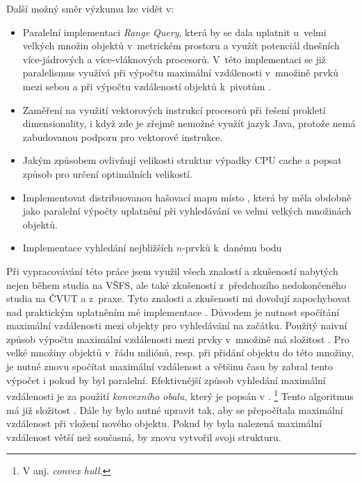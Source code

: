 Další možný směr výzkumu  lze vidět v:
\begin{itemize}
\item Paralelní implementaci \emph{Range Query}, která by se dala uplatnit u~velmi velkých množin objektů v~metrickém prostoru a využít potenciál dnešních více-jádrových a více-vláknových procesorů. V~této implementaci se již paralelismus využívá při výpočtu maximální vzdálenosti v~množině prvků mezi sebou a při výpočtu vzdáleností objektů k~pivotům .
\item Zaměření na využití vektorových instrukcí procesorů při řešení prokletí dimensionality, i když zde je zřejmě nemožné využít jazyk Java, protože nemá zabudovanou podporu pro vektorové instrukce.
\item Jakým způsobem ovlivňují velikosti struktur výpadky CPU cache a popsat způsob pro určení optimálních velikostí.
\item Implementovat distribuovanou hašovací mapu místo \BPTree{}, která by měla obdobně jako paralelní výpočty uplatnění při vyhledávání ve velmi velkých množinách objektů.
\item Implementace vyhledání nejbližších $n$-prvků k~danému bodu
 \end{itemize}
 
Při vypracovávání této práce jsem využil všech znalostí a zkušeností nabytých nejen během studia na VŠFS, ale také zkušeností z~předchozího nedokončeného studia na ČVUT a z~praxe.
Tyto znalosti a zkušenosti mi dovolují zapochybovat nad praktickým uplatněním mé implementace .
Důvodem je nutnost spočítání maximální vzdálenosti mezi objekty pro vyhledávání na začátku.
Použitý naivní způsob výpočtu maximální vzdálenosti mezi prvky v~množině má složitost .
Pro velké množiny objektů v~řádu miliónů, resp. při přidání objektu do této množiny, je nutné znovu spočítat maximální vzdálenost a většinu času by zabral tento výpočet i pokud by byl paralelní.
Efektivnější způsob vyhledání maximální vzdálenosti je za použití \emph{konvexního obalu}, který je popsán v \cite{Cormen:2001:IA:580470}.
\footnote{V anj. \emph{convex hull}.}
Tento algoritmus má již složitost .
Dále by bylo nutné upravit \MIndex{} tak, aby se přepočítala maximální vzdálenost při vložení nového objektu.
Pokud by byla nalezená maximální vzdálenost větší než současná, \MIndex{} by znovu vytvořil svoji strukturu.